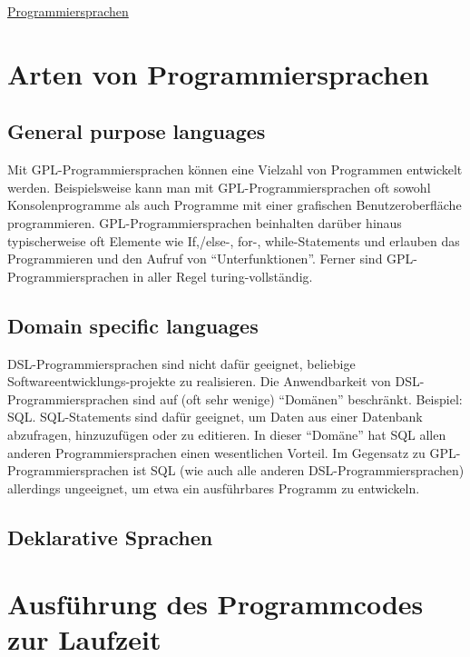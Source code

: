 \raggedright
\footnotesize
\begin{multicols}{3}	
	\setlength{\premulticols}{1pt}
	\setlength{\postmulticols}{1pt}
	\setlength{\multicolsep}{1pt}
	\setlength{\columnsep}{2pt}

\begin{center}
     \Large{\underline{Programmiersprachen}} \\
\end{center}

\section{Arten von Programmiersprachen}
\subsection{General purpose languages}
Mit GPL-Programmiersprachen können eine Vielzahl von Programmen entwickelt werden. Beispielsweise kann man mit GPL-Programmiersprachen oft sowohl Konsolenprogramme als auch Programme mit einer grafischen Benutzeroberfläche programmieren. GPL-Programmiersprachen beinhalten darüber hinaus typischerweise oft Elemente wie If,/else-, for-, while-Statements und erlauben das Programmieren und den Aufruf von \enquote{Unterfunktionen}. Ferner sind GPL-Programmiersprachen in aller Regel turing-vollständig.
\subsection{Domain specific languages}
DSL-Programmiersprachen sind nicht dafür geeignet, beliebige Softwareentwicklungs-projekte zu realisieren. Die Anwendbarkeit von DSL-Programmiersprachen sind auf (oft sehr wenige) \enquote{Domänen} beschränkt. Beispiel: SQL. SQL-Statements sind dafür geeignet, um Daten aus einer Datenbank abzufragen, hinzuzufügen oder zu editieren. In dieser \enquote{Domäne} hat SQL allen anderen Programmiersprachen einen wesentlichen Vorteil. Im Gegensatz zu GPL-Programmiersprachen ist SQL (wie auch alle anderen DSL-Programmiersprachen) allerdings ungeeignet, um etwa ein ausführbares Programm zu entwickeln.
\subsection{Deklarative Sprachen}

\section{Ausführung des Programmcodes zur Laufzeit}

\end{multicols}
